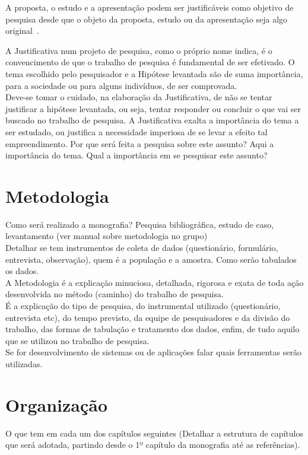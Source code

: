 \documentclass[
	12pt,				    %
	openright,			    %
	oneside,			    %
	a4paper,			    %
    sumario=tradicional,        %
	english,			    %
	brazil,				    %
 ]{abntex2}
\begin{document}
A proposta, o estudo e a apresentação podem ser justificáveis como objetivo de pesquisa desde que o objeto da proposta, estudo ou da apresentação seja algo original~\cite{wazlawick2009}.

A Justificativa num projeto de pesquisa, como o próprio nome indica, é o convencimento de que o trabalho de pesquisa é fundamental de ser efetivado. O tema escolhido pelo pesquisador e a Hipótese levantada são de suma importância, para a sociedade ou para alguns indivíduos, de ser comprovada. \\
Deve-se tomar o cuidado, na elaboração da Justificativa, de não se tentar justificar a hipótese levantada, ou seja, tentar responder ou concluir o que vai ser buscado no trabalho de pesquisa. A Justificativa exalta a importância do tema a ser estudado, ou justifica a necessidade imperiosa de se levar a efeito tal empreendimento.
Por que será feita a pesquisa sobre este assunto? Aqui a importância do tema. Qual a importância em se pesquisar este assunto?


\section{Metodologia}\label{sec:Metodologia}

Como será realizado a monografia? Pesquisa bibliográfica, estudo de caso, levantamento (ver manual sobre metodologia no grupo) \\
Detalhar se tem instrumentos de coleta de dados (questionário, formulário, entrevista, observação), quem é a população e a amostra. Como serão tabulados os dados. \\
A Metodologia é a explicação minuciosa, detalhada, rigorosa e exata de toda ação desenvolvida no método (caminho) do trabalho de pesquisa. \\
É a explicação do tipo de pesquisa, do instrumental utilizado (questionário, entrevista etc), do tempo previsto, da equipe de pesquisadores e da divisão do trabalho, das formas de tabulação e tratamento dos dados, enfim, de tudo aquilo que se utilizou no trabalho de pesquisa. \\
Se for desenvolvimento de sistemas ou de aplicações falar quais ferramentas serão utilizadas.


\section{Organização}\label{sec:Organizacao}

O que tem em cada um dos capítulos seguintes (Detalhar a estrutura de capítulos que será adotada, partindo desde o 1º capítulo da monografia até as referências).
\end{document}
